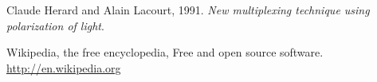 \documentclass[a4paper,12pt]{report}
\begin{document}
\maketitle{}

\newpage
\tableofcontents{}

\newpage
\listoffigures{}


\newpage


\newpage
%
\newpage
%
\newpage
%
\newpage
%
\newpage
%
\newpage
%
\newpage
%



\begin{thebibliography}{99}

 Claude Herard and Alain Lacourt, 1991.
  \textit{New multiplexing technique using polarization of light}.


Wikipedia, the free encyclopedia, Free and open source software.
\url{http://en.wikipedia.org}

\end{thebibliography}
\end{document}
